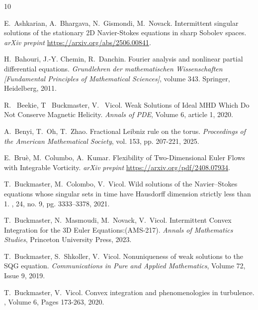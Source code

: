 \documentclass[12pt,reqno,letterpaper]{amsart}
\numberwithin{equation}{section}
\newcommand{\1}{{\bf 1}}
\newcommand{\2}{{\bf 2}}
\theoremstyle{remark}
\theoremstyle{remark}
\begin{document}
\begin{thebibliography}{10}

    E.~Ashkarian, A.~Bhargava, N.~Gismondi, M.~Novack.
    \newblock Intermittent singular solutions of the stationary 2D Navier-Stokes
    equations in sharp Sobolev spaces.
    \newblock \emph{arXiv prepint} \url{https://arxiv.org/abs/2506.00841}.

    H.~Bahouri, J.-Y. Chemin, R.~Danchin.
    \newblock Fourier analysis and nonlinear partial differential equations.
    \newblock \textit{Grundlehren der mathematischen Wissenschaften [Fundamental Principles of Mathematical Sciences]}, volume 343.  Springer, Heidelberg, 2011.

    R. ~Beekie, T ~Buckmaster, V. ~Vicol.
    \newblock Weak Solutions of Ideal MHD Which Do Not Conserve Magnetic Helicity.
    \newblock \emph{Annals of PDE}, Volume 6, article 1, 2020.

    A.~Benyi, T.~Oh, T.~Zhao.
    \newblock Fractional Leibniz rule on the torus. \newblock \emph{Proceedings of the American
        Mathematical Society}, vol. 153, pp. 207-221, 2025.

    E.~Bru\`{e}, M.~Columbo, A.~Kumar.
    \newblock Flexibility of Two-Dimensional Euler Flows with Integrable Vorticity.
    \newblock \emph{arXiv prepint} \url{https://arxiv.org/pdf/2408.07934}.

    \newblock T.~Buckmaster, M.~Colombo, V.~Vicol.
    \newblock Wild solutions of the Navier--Stokes equations whose singular sets in time have Hausdorff dimension strictly less than 1.
    , 24, no. 9, pg. 3333--3378, 2021.

    \newblock T.~Buckmaster, N.~Masmoudi, M.~Novack, V.~Vicol.
    \newblock Intermittent Convex Integration for the 3D Euler Equations:(AMS-217).
    \newblock\emph{Annals of Mathematics Studies}, Princeton University Press, 2023.

    T.~Buckmaster, S.~Shkoller, V.~Vicol.
    \newblock Nonuniqueness of weak solutions to the SQG equation.
    \newblock\emph{Communications in Pure and Applied Mathematics}, Volume 72, Issue 9, 2019.

    T.~Buckmaster, V.~Vicol.
    \newblock Convex integration and phenomenologies in turbulence.
    , Volume 6,  Pages 173-263, 2020.


\end{thebibliography}
\end{document}
